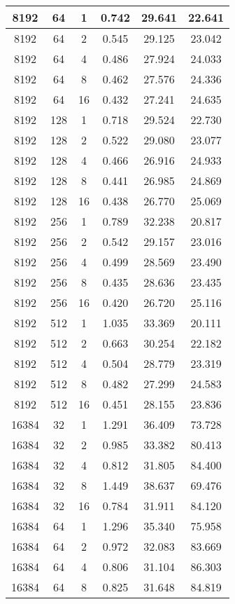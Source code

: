 \begin{longtable}{|c|c|c|c|c|c|}
\hline
8192 & 64 & 1 & 0.742 & 29.641 & 22.641 \\
\hline
8192 & 64 & 2 & 0.545 & 29.125 & 23.042 \\
\hline
8192 & 64 & 4 & 0.486 & 27.924 & 24.033 \\
\hline
8192 & 64 & 8 & 0.462 & 27.576 & 24.336 \\
\hline
8192 & 64 & 16 & 0.432 & 27.241 & 24.635 \\
\hline
8192 & 128 & 1 & 0.718 & 29.524 & 22.730 \\
\hline
8192 & 128 & 2 & 0.522 & 29.080 & 23.077 \\
\hline
8192 & 128 & 4 & 0.466 & 26.916 & 24.933 \\
\hline
8192 & 128 & 8 & 0.441 & 26.985 & 24.869 \\
\hline
8192 & 128 & 16 & 0.438 & 26.770 & 25.069 \\
\hline
8192 & 256 & 1 & 0.789 & 32.238 & 20.817 \\
\hline
8192 & 256 & 2 & 0.542 & 29.157 & 23.016 \\
\hline
8192 & 256 & 4 & 0.499 & 28.569 & 23.490 \\
\hline
8192 & 256 & 8 & 0.435 & 28.636 & 23.435 \\
\hline
8192 & 256 & 16 & 0.420 & 26.720 & 25.116 \\
\hline
8192 & 512 & 1 & 1.035 & 33.369 & 20.111 \\
\hline
8192 & 512 & 2 & 0.663 & 30.254 & 22.182 \\
\hline
8192 & 512 & 4 & 0.504 & 28.779 & 23.319 \\
\hline
8192 & 512 & 8 & 0.482 & 27.299 & 24.583 \\
\hline
8192 & 512 & 16 & 0.451 & 28.155 & 23.836 \\
\hline
16384 & 32 & 1 & 1.291 & 36.409 & 73.728 \\
\hline
16384 & 32 & 2 & 0.985 & 33.382 & 80.413 \\
\hline
16384 & 32 & 4 & 0.812 & 31.805 & 84.400 \\
\hline
16384 & 32 & 8 & 1.449 & 38.637 & 69.476 \\
\hline
16384 & 32 & 16 & 0.784 & 31.911 & 84.120 \\
\hline
16384 & 64 & 1 & 1.296 & 35.340 & 75.958 \\
\hline
16384 & 64 & 2 & 0.972 & 32.083 & 83.669 \\
\hline
16384 & 64 & 4 & 0.806 & 31.104 & 86.303 \\
\hline
16384 & 64 & 8 & 0.825 & 31.648 & 84.819 \\

\end{longtable}
